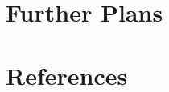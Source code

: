 \documentclass[11pt]{article}
\begin{document}
\section{Further Plans}







		




\section*{References}

\end{document}
